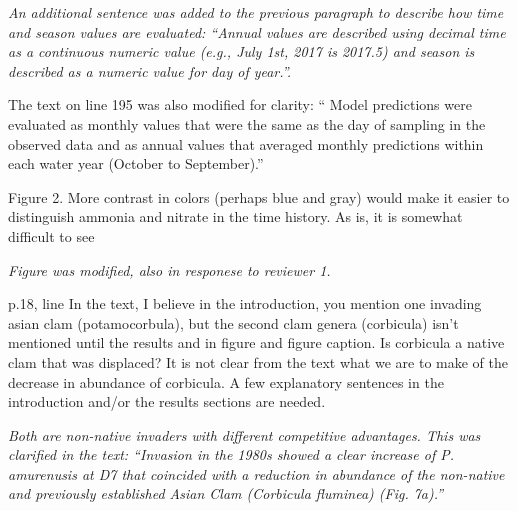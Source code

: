 \documentclass[letterpaper,12pt]{article}
\begin{document}
{\it An additional sentence was added to the previous paragraph to describe how time and season values are evaluated: ``Annual values are described using decimal time as a continuous numeric value (e.g., July 1st, 2017 is 2017.5) and season is described as a numeric value for day of year.''. 

The text on line 195 was also modified for clarity: `` Model predictions were evaluated as monthly values that were the same as the day of sampling in the observed data and as annual values that averaged monthly predictions within each water year (October to September).''
}

Figure 2.  More contrast in colors (perhaps blue and gray) would make it easier to distinguish ammonia and nitrate in the time history.  As is, it is somewhat difficult to see

{\it Figure was modified, also in responese to reviewer 1.}

p.18, line  In the text, I believe in the introduction, you mention one invading asian clam (potamocorbula), but the second clam genera (corbicula) isn't mentioned until the results and in figure and figure caption.  Is corbicula a native clam that was displaced?  It is not clear from the text what we are to make of the decrease in abundance of corbicula.  A few explanatory sentences in the introduction and/or the results sections are needed.

{\it Both are non-native invaders with different competitive advantages.  This was clarified in the text: ``Invasion in the 1980s showed a clear increase of \textit{P. amurenusis} at D7 that coincided with a reduction in abundance of the non-native and previously established Asian Clam (\textit{Corbicula fluminea}) (Fig. 7a).''}
\end{document}
